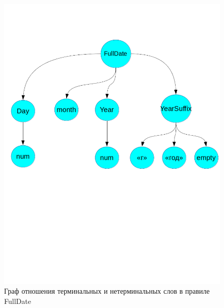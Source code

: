 \begin{figure}%
\centering
\includegraphics[width=\textwidth]{img/FullDateRule.png}
\caption{Граф отношения терминальных и нетерминальных слов в правиле FullDate}
\label{fig:FullDateRule}
\end{figure}


